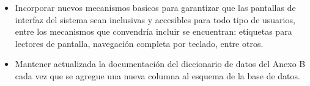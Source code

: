 \begin{itemize}
    \item Incorporar nuevos mecanismos basicos para garantizar que las pantallas de interfaz del sistema sean inclusivas y accesibles para todo tipo de usuarios, entre los mecanismos que convendría incluir se encuentran: etiquetas para lectores de pantalla, navegación completa por teclado, entre otros.
    \item Mantener actualizada la documentación del diccionario de datos del Anexo B cada vez que se agregue una nueva columna al esquema de la base de datos.
\end{itemize}
